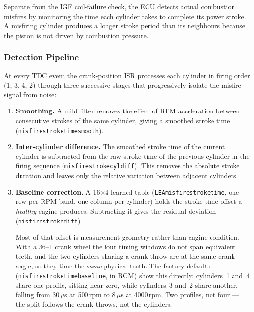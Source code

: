 \documentclass[a4paper,11pt]{article}
\renewcommand{\_}{\oldunderscore\allowbreak}
\begin{document}
Separate from the IGF coil-failure check, the ECU detects actual combustion
misfires by monitoring the time each cylinder takes to complete its power
stroke. A misfiring cylinder produces a longer stroke period than its
neighbours because the piston is not driven by combustion pressure.

\subsubsection*{Detection Pipeline}

At every TDC event the crank-position ISR processes each cylinder in firing
order (1, 3, 4, 2) through three successive stages that progressively isolate
the misfire signal from noise:

\begin{enumerate}
  \item \textbf{Smoothing.} A mild filter removes the effect of RPM
        acceleration between consecutive strokes of the same cylinder, giving a
        smoothed stroke time (\texttt{misfire\_stroke\_time\_smooth}).

  \item \textbf{Inter-cylinder difference.} The smoothed stroke time of the
        current cylinder is subtracted from the raw stroke time of the previous
        cylinder in the firing sequence (\texttt{misfire\_stroke\_cyl\_diff}).
        This removes the absolute stroke duration and leaves only the
        relative variation between adjacent cylinders.

  \item \textbf{Baseline correction.} A 16$\times$4 learned table
        (\texttt{LEA\_misfire\_stroke\_time}, one row per RPM band, one column
        per cylinder) holds the stroke-time offset a \emph{healthy} engine
        produces. Subtracting it gives the residual deviation
        (\texttt{misfire\_stroke\_diff\_1}).

        Most of that offset is measurement geometry rather than engine
        condition. With a 36--1 crank wheel the four timing windows do not
        span equivalent teeth, and the two cylinders sharing a crank throw are
        at the same crank angle, so they time the \emph{same} physical teeth.
        The factory defaults (\texttt{misfire\_stroke\_time\_baseline}, in ROM)
        show this directly: cylinders~1 and~4 share one profile, sitting near
        zero, while cylinders~3 and~2 share another, falling from 30\,$\mu$s at
        500\,rpm to 8\,$\mu$s at 4000\,rpm. Two profiles, not four --- the
        split follows the crank throws, not the cylinders.


\end{enumerate}
\end{document}
